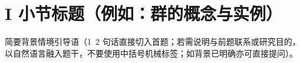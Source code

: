 
\section*{I 小节标题（例如：群的概念与实例）}

简要背景情境引导语（1~2 句话直接切入首题；若需说明与前题联系或研究目的，以自然语言融入题干，不要使用中括号机械标签；如背景已明确亦可直接提问）。

